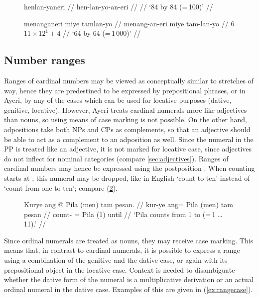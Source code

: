 \begin{figure}[h]
\pex\label{ex:distnuminfl}
\a\begingl
	\gla henlan-yaneri //
	\glb hen-lan-yo-an-eri //
	 //
	\glft `84 by 84 (=\,100)' //
\endgl

\a\begingl
	\gla menanganeri miye tamlan-yo //
	\glb menang-an-eri miye tam-lan-yo //
	 {$6$} {$11 \times 12^1 + 4$} //
	\glft `6\elv{}4 by 6\elv{}4 (=\,1\,000)' //
\endgl
\xe
\end{figure}


\subsection{Number ranges}

Ranges of cardinal numbers may be viewed as conceptually similar to stretches
of way, hence they are predestined to be expressed by prepositional phrases,
or in Ayeri, by any of the cases which can be used for locative purposes
(dative, genitive, locative). However, Ayeri treats cardinal numerals more
like adjectives than nouns, so using means of case marking is not possible. On
the other hand, adpositions take both NPs and CPs as complements, so that an
adjective should be able to act as a complement to an adposition as well.
Since the numeral in the PP is treated like an adjective, it is not marked for
locative case, since adjectives do not inflect for nominal categories (compare
\autoref{sec:adjectives}). Ranges of cardinal numbers may hence be expressed
using the postposition . When counting starts
at , this numeral may be dropped, like in English `count
to ten' instead of `count from one to ten'; compare (\ref{ex:numstretch}).

\begin{figure}[h]
\ex\label{ex:numstretch}
\begingl
	\gla Kurye ang @ Pila \textup{(}men\textup{)} tam pesan. //
	\glb kur-ye ang= Pila (men) tam pesan //
	\glc count-\TsgF{} \Aarg{}= Pila (1) \elv{} until //
	\glft `Pila counts from 1 to \elv{} (=\,1 … 11).' //
\endgl
\xe
\end{figure}

Since ordinal numerals are treated as nouns, they may receive case marking.
This means that, in contrast to cardinal numerals, it is possible to express a
range using a combination of the genitive and the dative case, or again
 with its prepositional object in the locative case.
Context is needed to disambiguate whether the dative form of the numeral is a
multiplicative derivation or an actual ordinal numeral in the dative case.
Examples of this are given in (\ref{ex:rangecase}).

